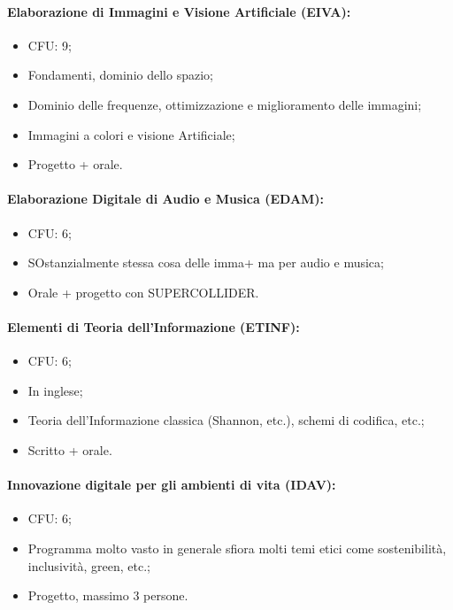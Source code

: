 \paragraph{Elaborazione di Immagini e Visione Artificiale (EIVA):}

\begin{itemize}
  \item CFU: 9;
  \item Fondamenti, dominio dello spazio;
  \item Dominio delle frequenze, ottimizzazione e miglioramento delle immagini;
  \item Immagini a colori e visione Artificiale;
  \item Progetto + orale.
\end{itemize}

\paragraph{Elaborazione Digitale di Audio e Musica (EDAM):}

\begin{itemize}
  \item CFU: 6;
  \item SOstanzialmente stessa cosa delle imma+ ma per audio e musica;
  \item Orale + progetto con SUPERCOLLIDER.
\end{itemize}

\paragraph{Elementi di Teoria dell'Informazione (ETINF):}

\begin{itemize}
  \item CFU: 6;
  \item In inglese;
  \item Teoria dell'Informazione classica (Shannon, etc.), schemi di codifica, etc.;
  \item Scritto + orale.
\end{itemize}

\paragraph{Innovazione digitale per gli ambienti di vita (IDAV):}

\begin{itemize}
  \item CFU: 6;
  \item Programma molto vasto in generale sfiora molti temi etici come sostenibilità, inclusività, green, etc.;
  \item Progetto, massimo 3 persone. 
\end{itemize}

